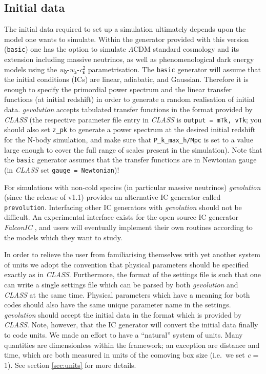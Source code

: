 \documentclass[a4paper,10pt]{article}
\begin{document}
\subsection{Initial data}
\label{sec:IC}

The initial data required to set up a simulation ultimately depends upon the model one wants to simulate. Within the generator provided with
this version (\texttt{basic}) one has the option to simulate $\mathsf{\Lambda}$CDM standard cosmology and its extension including massive
neutrinos, as well as phenomenological dark energy models using the \textit{w}$_\mathsf{0}$-\textit{w}$_\mathsf{a}$-\textit{c}$_\mathsf{s}^\mathsf{2}$ parametrisation.
The \texttt{basic} generator will assume that the initial conditions (ICs) are linear, adiabatic, and Gaussian. Therefore it is
enough to specify the primordial power spectrum and the linear transfer functions (at initial redshift) in order to generate a random
realisation of initial data.
\textit{gevolution} accepts tabulated transfer functions in the format provided by \textit{CLASS} (the respective parameter file entry in
\textit{CLASS} is \texttt{output = mTk, vTk}; you should also set \texttt{z\_pk} to generate a power spectrum at the desired initial
redshift for the N-body simulation, and make sure that \texttt{P\_k\_max\_h/Mpc} is set to a value large enough to cover the full range of
scales present in the simulation). Note that the \texttt{basic} 
generator assumes that the transfer functions are in Newtonian gauge (in \textit{CLASS} set \texttt{gauge = Newtonian})!

For simulations with non-cold species (in particular massive neutrinos) \textit{gevolution} (since the release of v1.1) provides an alternative IC
generator called \texttt{prevolution}.
Interfacing other IC generators with \textit{gevolution} should not be difficult. An experimental interface exists for the
open source IC generator \textit{FalconIC} \cite{Valkenburg:2015dsa}, and users will eventually implement their own routines according to the
models which they want to study.

In order to relieve the user from familiarising themselves with yet another system of units we adopt the convention that physical parameters
should be specified exactly as in \textit{CLASS}. Furthermore, the format of the settings file is such that one can write a single settings
file which can be parsed by both \textit{gevolution} and \textit{CLASS} at the same time. Physical parameters which have a meaning for both
codes should also have the same unique parameter name in the settings. \textit{gevolution} should accept the initial data in the format
which is provided by \textit{CLASS}. Note, however, that the IC generator will convert the initial data finally to code units. We made an
effort to have a ``natural'' system of units. Many quantities are dimensionless within the framework; an exception are distance and time,
which are both measured in units of the comoving box size (i.e.\ we set \textit{c} = 1). See section \ref{sec:units} for more details.
\end{document}
